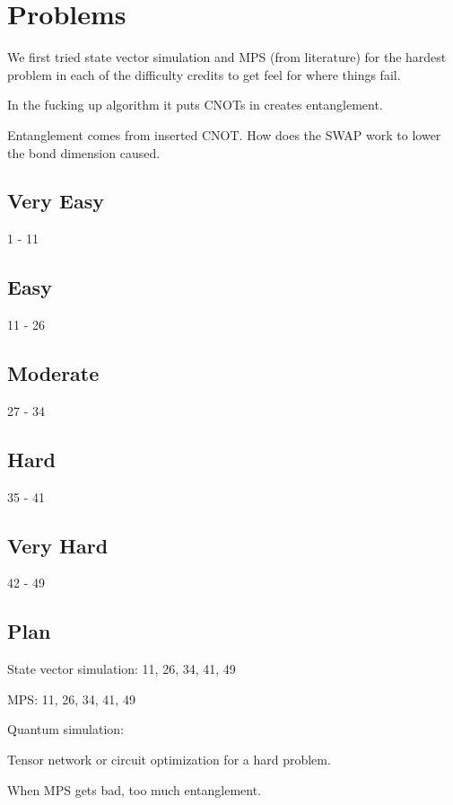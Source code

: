 \section{Problems}

We first tried state vector simulation and MPS (from literature) for the hardest problem in each of the difficulty credits to get feel for where things fail.

In the fucking up algorithm it puts CNOTs in creates entanglement.

Entanglement comes from inserted CNOT.
How does the SWAP work to lower the bond dimension caused.


\subsection{Very Easy}

1 - 11

\subsection{Easy}

11 - 26

\subsection{Moderate}

27 - 34

\subsection{Hard}

35 - 41

\subsection{Very Hard}

42 - 49


\subsection{Plan}

State vector simulation: 11, 26, 34, 41, 49

MPS: 11, 26, 34, 41, 49

Quantum simulation:



Tensor network or circuit optimization for a hard problem.

When MPS gets bad, too much entanglement.



